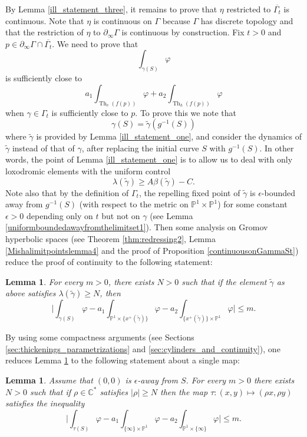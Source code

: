 \documentclass[12pt]{amsbook}%
\newtheorem{lem}[thm]{Lemma}
\theoremstyle{definition}
\theoremstyle{remark}
\numberwithin{section}{chapter}
\numberwithin{subsection}{section}
\numberwithin{figure}{chapter}
\DeclareMathOperator{\Th}{Th}
\def\dyl{>0}
\def\bC{{\mathbb{C}}}
\def\bP{{\mathbb{P}}}
\def\tga{{\tilde{\gamma}}}
\def\ga{\gamma}
\def\geo{\partial_\infty}
\begin{document}
{{By Lemma \ref{ill_statement_three}, it remains to prove that $\eta$ restricted to $\overline{\Gamma_t}$ is continuous. Note that $\eta$ is continuous on $\Gamma$ because $\Gamma$ has discrete topology and that the restriction of $\eta$ to $\geo \Gamma$ is continuous by construction. Fix $t\dyl$ and $p\in \geo \Gamma \cap \overline{\Gamma_t}$. We need to prove that 
\[\int_{\gamma(S)}\varphi\]
is sufficiently close to 
\[
a_1\int_{\Th_v(f(p))}\varphi +a_2\int_{\Th_h(f(p))}\varphi
\]
when $\gamma\in \Gamma_t$ is sufficiently close to $p$. To prove this we note that 
\[\ga(S)=\tga(g^{-1}(S))\]
where $\tga$ is provided by Lemma \ref{ill_statement_one}, and consider the dynamics of $\tga$ instead of that of $\ga$, after replacing the initial curve $S$ with $g^{-1}(S)$. In other words, the point of Lemma \ref{ill_statement_one} is to allow us to deal with only loxodromic elements with the uniform control 
\[\lambda(\tga)\geqslant A\beta(\tga)-C.\]
Note also that by the definition of $\Gamma_t$, the repelling fixed point of $\tga$ is $\epsilon$-bounded away from $g^{-1}(S)$ (with respect to the metric on $\bP^1\times \bP^1$) for some constant $\epsilon\dyl$ depending only on $t$ but not on $\ga$ (see Lemma \ref{uniformboundedawayfromthelimitset1}). Then some analysis on Gromov hyperbolic spaces (see Theorem \ref{thm:redressing2}, Lemma \ref{Mishalimitpointslemma4} and the proof of Proposition \ref{continuousonGammaSt}) reduce  the proof of continuity to the following statement:
\begin{lem}\label{ill_statement_four_bis}
For every  $m\dyl$, there exists $N\dyl$ such that if the element $\tga$ as above satisfies $\lambda(\tga) \geqslant N$, then 
\[
\big\lvert\int_{\ga(S)}\varphi-a_1\int_{\bP^1\times \{x^+(\tga)\}}\varphi-a_2\int_{\{x^+(\tga)\}\times \bP^1}\varphi\big\rvert\leqslant m.
\]
\end{lem}
By using some compactness arguments (see Sections \ref{sec:thickenings_parametrizations} and \ref{sec:cylinders_and_continuity}), one reduces Lemma \ref{ill_statement_four_bis} to the following statement about a single map:
\begin{lem}\label{ill_statement_four}
Assume that $(0,0)$ is $\epsilon$-away from $S$. For every $m\dyl$ there exists $N\dyl$ such that if $\rho\in \bC^*$ satisfies $\lvert\rho\rvert \geqslant N$ then the map $\tau:(x,y)\mapsto (\rho x,\rho y)$ satisfies the inequality
\[
\big\lvert\int_{\tau(S)}\varphi-a_1\int_{\{\infty\}\times \bP^1}\varphi-a_2\int_{\bP^1\times \{\infty\}}\varphi\big\rvert\leqslant m.
\]
\end{lem}

}}
\end{document}
